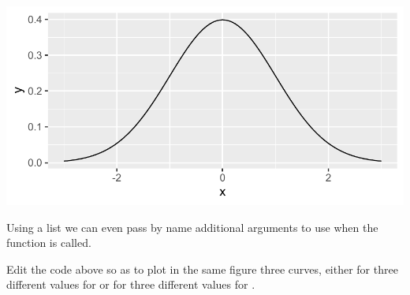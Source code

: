\documentclass[krantz2]{krantz}\usepackage{knitr}
\begin{document}
\begin{knitrout}\footnotesize
{}\color{fgcolor}\begin{kframe}
\begin{alltt}
\hlstd{(}\hlstd{(} \hlstd{=} \hlopt{-}\hlopt{:}\hlstd{),} \hlstd{(}  \hlopt{+}
  \hlstd{(} 
\end{alltt}
\end{kframe}

{\centering \includegraphics[width=.7\textwidth]{figure/pos-function-plot-01-1}

}



\end{knitrout}

Using a list we can even pass by name additional arguments to use when the function is called.

\begin{knitrout}\footnotesize
{}\color{fgcolor}\begin{kframe}
\begin{alltt}
\hlstd{(}\hlstd{(} \hlstd{=} \hlopt{-}\hlopt{:}\hlstd{),} \hlstd{(}  \hlopt{+}
  \hlstd{(}   \hlstd{=} \hlstd{(} \hlstd{=} \hlstd{,}  \hlstd{=} \hlstd{))}
\end{alltt}
\end{kframe}
\end{knitrout}

\begin{playground}
Edit the code above so as to plot in the same figure three curves, either for three different values for  or for three different values for .
\end{playground}
\end{document}
